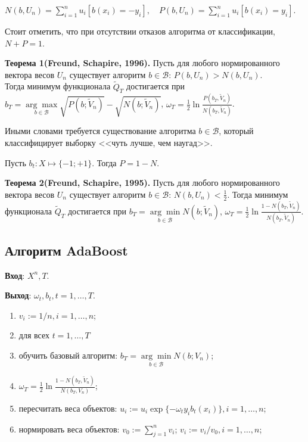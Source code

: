 \documentclass[specialist, 12pt, href]{article}
\begin{document}
$N(b, U_n) = \sum\limits_{i = 1}^n  u_i[b(x_i) = -y_i], \quad P(b, U_n) = \sum\limits_{i = 1}^n  u_i[b(x_i) = y_i].$

Стоит отметить, что при отсутствии отказов алгоритма от классификации, $N + P = 1$.

\textbf{Теорема 1(Freund, Schapire, 1996).} Пусть для любого нормированного вектора весов $ U_n$ существует алгоритм $b \in \mathcal{B}$: $P(b, U_n) > N(b, U_n)$. \\
Тогда минимум функционала $\tilde Q_T$ достигается при
$b_T =  \underset{b  \in \mathcal{B}}{\arg\max} \sqrt{P(b;\tilde V_n)} - \sqrt{N(b;\tilde V_n)}$, $\omega_T = \frac{1}{2} \ln\frac{P(b_T,\tilde V_n)}{N(b_T,\tilde V_n)}$.

Иными словами требуется существование алгоритма $b \in \mathcal{B}$, который классифицирует выборку <<чуть лучше, чем наугад>>.


Пусть $b_t: X \mapsto \{-1;+1\}$. Тогда $P = 1 - N$.

\textbf{Теорема 2(Freund, Schapire, 1995).} Пусть для любого нормированного вектора весов $ U_n$ существует алгоритм $b \in \mathcal{B}$: $N(b, U_n) < \frac{1}{2}$.
Тогда минимум функционала $\tilde Q_T$ достигается при 
$b_T =  \underset{b  \in \mathcal{B}}{\arg\min} N(b;\tilde V_n)$, $\omega_T = \frac{1}{2} \ln\frac{1 - N(b_T,\tilde V_n)}{N(b_T,\tilde V_n)}$.

\subsection*{Алгоритм AdaBoost}

{\bf {Вход}}: $X^n, T$.

{\bf {Выход}}: $\omega_t, b_t, t = 1,\dots,T$.
\begin{enumerate}
   \item $v_i := 1/n, i = 1,\dots,n$;
   \item для всех $t = 1,\dots,T$
   \item \quad обучить базовый алгоритм: $b_T =  \underset{b  \in \mathcal{B}}{\arg\min} N(b;V_n)$;
   \item \quad $\omega_T = \frac{1}{2} \ln\frac{1 - N(b_T,\tilde V_n)}{N(b_T, V_n)}$;
   \item \quad пересчитать веса объектов: $u_i := u_i \exp\{-\omega_t y_i b_t(x_i)\}, i = 1,\dots,n$;
   \item \quad нормировать веса объектов: $v_0 := \sum\limits_{j=1}^n v_i$; $v_i := v_i/v_0, i = 1,\dots,n$;
\end{enumerate}
\end{document}
